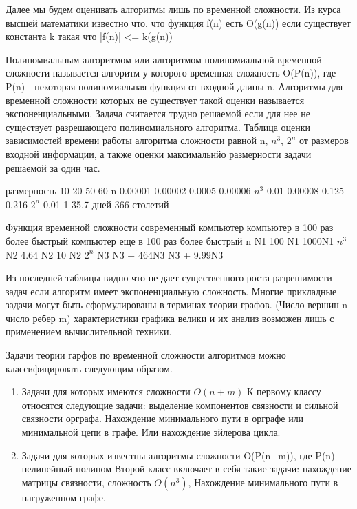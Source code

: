 {Далее мы будем оценивать алгоритмы лишь по временной сложности. Из курса высшей математики известно что. что функция f(n) есть O(g(n)) если существует константа k такая что |f(n)| <= k(g(n))

Полиномиальным алгоритмом или алгоритмом полиномиальной временной сложности называется алгоритм у которого временная сложность O(P(n)), где P(n) - некоторая полиномиальная функция от входной длины n. Алгоритмы для временной сложности которых не существует такой оценки называется экспоненциальными. Задача считается трудно решаемой если для нее не существует разрешающего полиномиального алгоритма. Таблица оценки зависимостей времени работы алгоритма сложности равной n, $n^3$, $2^n$ от размеров входной информации, а также оценки максимальнйо размерности задачи решаемой за один час.

размерность            10           20                50                            60
n			0.00001     0.00002           0.0005			    0.00006
$n^3$			0.01        0.00008	      0.125			    0.216
$2^n$			0.01	    1		      35.7 дней			    366 столетий


Функция временной сложности         современный компьютер	компьютер в 100 раз более быстрый компьютер еще в 100 раз более быстрый
n 					N1				100 N1				1000N1
$n^3$					N2				4.64 N2				10 N2
$2^n$					N3				N3 + 464N3			N3 + 9.99N3


Из последней таблицы видно что не дает существенного роста разрешимости задач если алгоритм имеет экспоненциальную сложность. Многие прикладные задачи могут быть сформулированы в терминах теории графов. (Число вершин n число ребер m) характеристики графика велики и их анализ возможен лишь с применением вычислительной техники.

Задачи теории гарфов по временной сложности алгоритмов можно классифицировать следующим образом.
\begin{enumerate}

\item Задачи для которых имеются сложности $O(n+m)$
К первому классу относятся следующие задачи: выделение компонентов связности и сильной связности орграфа. Нахождение минимального пути в орграфе или минимальной цепи в графе. Или нахождение эйлерова цикла.

\item Задачи для которых известны алгоритмы сложности O(P(n+m)), где P(n) нелинейный полином
Второй класс включает в себя такие задачи: нахождение матрицы связности, сложность $O(n^3)$, Нахождение минимального пути  в нагруженном графе.


\end{enumerate}}
